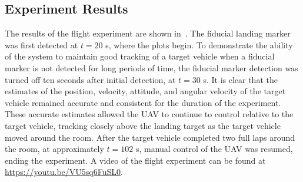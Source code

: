 
\subsection{Experiment Results}

The results of the flight experiment are shown in~.
The fiducial landing marker was first detected at $t = 20$ s, where the plots
begin.
To demonstrate the ability of the
system to maintain good tracking of a target vehicle when a fiducial
marker is not detected for long periods of time, the fiducial marker detection
was turned off ten seconds after initial detection, at $t = 30$ s.
It is clear that the estimates of the position, velocity, attitude, and angular
velocity of the target vehicle remained accurate and consistent for the duration
of the experiment.
These accurate estimates allowed
the UAV to continue to control relative to the target vehicle, tracking closely
above the landing target as the target vehicle moved around the room. After the
target vehicle completed two full laps around the room,
at approximately $t=102$ s, manual control of the UAV was resumed, ending the experiment.
A video of the flight experiment can be found at
\url{https://youtu.be/VU5sq6FuSL0}.

